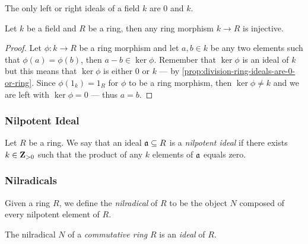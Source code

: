 \begin{corollary}
    \label{cor:field-ideals}
    The only left or right ideals of a field \(k\) are \(0\) and \(k\).
\end{corollary}

\begin{proposition}
    \label{prop:morphism-field-to-ring-is-injective}
    Let \(k\) be a field and \(R\) be a ring, then any ring morphism \(k \to R\) is
    injective.
\end{proposition}

\begin{proof}
    Let \(\phi: k \to R\) be a ring morphism and let \(a, b \in k\) be any two
    elements such that \(\phi(a) = \phi(b)\), then \(a - b \in \ker \phi\). Remember
    that \(\ker \phi\) is an ideal of \(k\) but this means that \(\ker \phi\) is
    either \(0\) or \(k\) --- by
    \cref{prop:division-ring-ideals-are-0-or-ring}. Since \(\phi(1_k) = 1_R\) for
    \(\phi\) to be a ring morphism, then \(\ker \phi \neq k\) and we are left with
    \(\ker \phi = 0\) --- thus \(a = b\).
\end{proof}

\subsubsection{Nilpotent Ideal}

\begin{definition}
    \label{def:nilpotent-ideal}
    Let \(R\) be a ring. We say that an ideal \(\mathfrak{a} \subseteq R\) is a \emph{nilpotent
        ideal} if there exists \(k \in \mathbf{Z}_{> 0}\) such that the product of any \(k\)
    elements of \(\mathfrak{a}\) equals zero.
\end{definition}

\subsubsection{Nilradicals}

\begin{definition}[Nilradical]
    \label{def:nilradical}
    Given a ring \(R\), we define the \emph{nilradical} of \(R\)
    to be the object \(N\) composed of every nilpotent element of \(R\).
\end{definition}

\begin{corollary}
    \label{cor:nilradical-is-ideal}
    The nilradical \(N\) of a \emph{commutative ring} \(R\) is an \emph{ideal} of
    \(R\).
\end{corollary}

